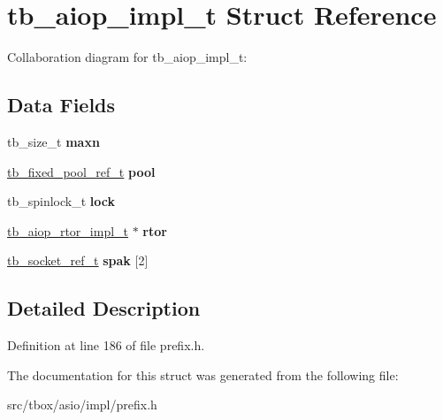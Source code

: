 \hypertarget{structtb__aiop__impl__t}{\section{tb\-\_\-aiop\-\_\-impl\-\_\-t Struct Reference}
\label{structtb__aiop__impl__t}
}


Collaboration diagram for tb\-\_\-aiop\-\_\-impl\-\_\-t\-:
\subsection*{Data Fields}
\begin{DoxyCompactItemize}
\item 
\hypertarget{structtb__aiop__impl__t_a8ddb32df20794be63286587f706453b2}{tb\-\_\-size\-\_\-t {\bfseries maxn}}\label{structtb__aiop__impl__t_a8ddb32df20794be63286587f706453b2}

\item 
\hypertarget{structtb__aiop__impl__t_a9f83c1a957269fff75bb1c2df01df0ac}{\hyperlink{structtb__fixed__pool__ref__t}{tb\-\_\-fixed\-\_\-pool\-\_\-ref\-\_\-t} {\bfseries pool}}\label{structtb__aiop__impl__t_a9f83c1a957269fff75bb1c2df01df0ac}

\item 
\hypertarget{structtb__aiop__impl__t_a764fee205b5af0d45b3a1d14ceaea472}{tb\-\_\-spinlock\-\_\-t {\bfseries lock}}\label{structtb__aiop__impl__t_a764fee205b5af0d45b3a1d14ceaea472}

\item 
\hypertarget{structtb__aiop__impl__t_a08f9b2c37e14ed7b0e1af2c995a224d5}{\hyperlink{structtb__aiop__rtor__impl__t}{tb\-\_\-aiop\-\_\-rtor\-\_\-impl\-\_\-t} $\ast$ {\bfseries rtor}}\label{structtb__aiop__impl__t_a08f9b2c37e14ed7b0e1af2c995a224d5}

\item 
\hypertarget{structtb__aiop__impl__t_a31f071cf18b81c986c3c1ec7704c2127}{\hyperlink{structtb__socket__ref__t}{tb\-\_\-socket\-\_\-ref\-\_\-t} {\bfseries spak} \mbox{[}2\mbox{]}}\label{structtb__aiop__impl__t_a31f071cf18b81c986c3c1ec7704c2127}

\end{DoxyCompactItemize}


\subsection{Detailed Description}


Definition at line 186 of file prefix.\-h.



The documentation for this struct was generated from the following file\-:\begin{DoxyCompactItemize}
\item 
src/tbox/asio/impl/prefix.\-h\end{DoxyCompactItemize}
